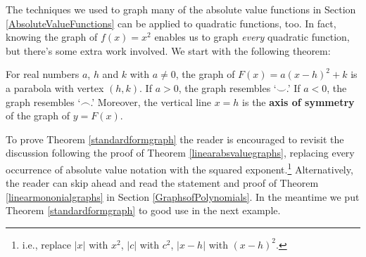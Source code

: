 The techniques we used to graph many of the absolute value functions in Section \ref{AbsoluteValueFunctions} can be applied to quadratic functions, too.  In fact, knowing the graph of $f(x) = x^2$ enables us to graph \emph{every} quadratic function, but there's some extra work involved.  We start with the following theorem:

\medskip

\colorbox{ResultColor}{\bbm

\begin{thm}  \label{standardformgraph}  For real numbers $a$, $h$ and $k$ with $a\neq 0$, the graph of  $F(x) = a(x-h)^2 + k$ is a parabola with vertex $(h,k)$.  If $a>0$, the graph resembles  `$\smile$.'  If $a<0$, the graph resembles `$\frown$.'  Moreover, the vertical line $x=h$ is the  \textbf{axis of symmetry} of the graph of $y = F(x)$.
\end{thm}
\ebm}

\medskip

To prove Theorem \ref{standardformgraph} the reader is encouraged to revisit the discussion following the proof of Theorem \ref{linearabsvaluegraphs}, replacing every occurrence of absolute value notation with the squared exponent.\footnote{i.e., replace $|x|$ with $x^2$, $|c|$ with $c^2$, $|x-h|$ with $(x-h)^2$.} Alternatively, the reader can skip ahead and read the statement and proof of Theorem \ref{linearmononialgraphs} in Section \ref{GraphsofPolynomials}.  In the meantime we put Theorem \ref{standardformgraph}  to good use in the next example.

